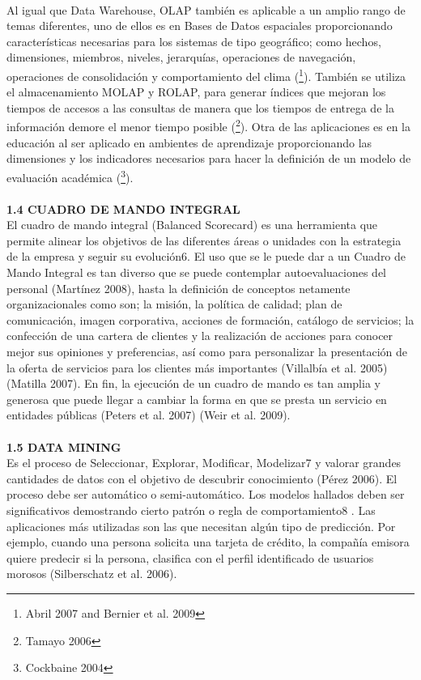 \documentclass[a4paper,12pt,twocolumn]{article}
\begin{document}
\textbf{}\\
Al igual que Data Warehouse, OLAP también es aplicable a un amplio rango de temas diferentes, uno de ellos es en Bases de Datos espaciales proporcionando características necesarias para los sistemas de tipo geográfico; como hechos, dimensiones, miembros, niveles, jerarquías, operaciones de navegación, operaciones de consolidación y comportamiento del clima (\footnote{Abril 2007 and Bernier et al. 2009}). También se utiliza el almacenamiento MOLAP y ROLAP, para generar índices que mejoran los tiempos de accesos a las consultas de manera que los tiempos de entrega de la información demore el menor tiempo posible (\footnote{Tamayo 2006}). Otra de las aplicaciones es en la educación al ser aplicado en ambientes de aprendizaje proporcionando las dimensiones y los indicadores necesarios para hacer la definición de un modelo de evaluación académica (\footnote{Cockbaine 2004}).
\textbf{}\\
\textbf{}\\
\textbf{1.4 CUADRO DE MANDO INTEGRAL}\\
El cuadro de mando integral (Balanced Scorecard) es una herramienta que permite alinear los objetivos de las diferentes áreas o unidades con la estrategia de la empresa y seguir su evolución6. El uso que se le puede dar a un Cuadro de Mando Integral es tan diverso que se puede contemplar autoevaluaciones del personal (Martínez 2008), hasta la definición de conceptos netamente organizacionales como son; la misión, la política de calidad; plan de comunicación, imagen corporativa, acciones de formación, catálogo de servicios; la confección de una cartera de clientes y la realización de acciones para conocer mejor sus opiniones y preferencias, así como para personalizar la presentación de la oferta de servicios para los clientes más importantes (Villalbía et al. 2005) (Matilla 2007). En fin, la ejecución de un cuadro de mando es tan amplia y generosa que puede llegar a cambiar la forma en que se presta un servicio en entidades públicas (Peters et al. 2007) (Weir et al. 2009).
\textbf{}\\
\textbf{}\\
\textbf{1.5 DATA MINING }
\textbf{}\\
Es el proceso de Seleccionar, Explorar, Modificar, Modelizar7 y valorar grandes cantidades de datos con el objetivo de descubrir conocimiento (Pérez 2006). El proceso debe ser automático o semi-automático. Los modelos hallados deben ser significativos demostrando cierto patrón o regla de comportamiento8 . Las aplicaciones más utilizadas son las que necesitan algún tipo de predicción. Por ejemplo, cuando una persona solicita una tarjeta de crédito, la compañía emisora quiere predecir si la persona, clasifica con el perfil identificado de usuarios morosos (Silberschatz et al. 2006). \textbf{}\\
\end{document}
